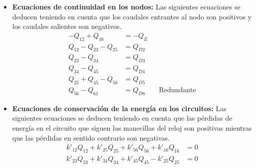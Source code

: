 \documentclass[11pt, oneside]{article}
\begin{document}
\begin{itemize}
\item \textbf{Ecuaciones de continuidad en los nodos:} Las siguientes ecuaciones se deducen teniendo en cuenta que los caudales entrantes al nodo son positivos y los caudales salientes son negativos.
\begin{equation}
\begin{aligned}
-Q_{12}+Q_{16} &= -Q_E \\
Q_{12}-Q_{23}-Q_{25} &= Q_{D2} \\
Q_{23}-Q_{34} &= Q_{D3}\\
Q_{34}-Q_{45} &= Q_{D4} \\
Q_{25}+Q_{45}-Q_{56} &= Q_{D5}\\
Q_{56}-Q_{61}&=Q_{D6} && \text{Redundante}
\end{aligned}
\label{cpne31}
\end{equation}


\item \textbf{Ecuaciones de conservaci\'on de la energ\'ia en los circuitos:} Las siguientes ecuaciones se deducen teniendo en cuenta que las p\'erdidas de energ\'ia en el circuito que siguen las manecillas del reloj son positivas mientras que las p\'erdidas en sentido contrario son negativas.
\begin{equation}
\begin{aligned}
k'_{12} Q_{12} + k'_{25} Q_{25} + k'_{56} Q_{56} + k'_{16} Q_{16} &= 0 \\
k'_{23} Q_{23} + k'_{34} Q_{34} + k'_{45} Q_{45} - k'_{25} Q_{25} &= 0 \\
\end{aligned}
\label{cpne32}
\end{equation}


\end{itemize}
\end{document}
